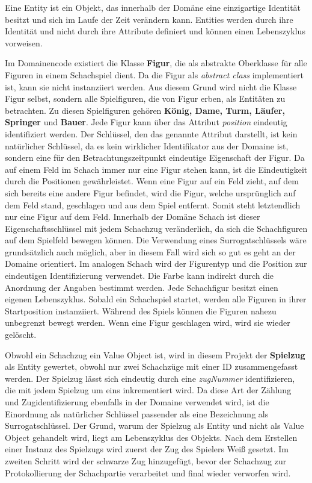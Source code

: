 Eine Entity ist ein Objekt, das innerhalb der Domäne eine einzigartige Identität besitzt und sich im Laufe der Zeit verändern kann. 
Entities werden durch ihre Identität und nicht durch ihre Attribute definiert und können einen Lebenszyklus vorweisen. 

Im Domainencode existiert die Klasse \textbf{Figur}, die als abstrakte Oberklasse für alle Figuren in einem Schachspiel dient. 
Da die Figur als \textit{abstract class} implementiert ist, kann sie nicht instanziiert werden. 
Aus diesem Grund wird nicht die Klasse Figur selbst, sondern alle Spielfiguren, die von Figur erben, als Entitäten zu betrachten. 
Zu diesen Spielfiguren gehören \textbf{König, Dame, Turm, Läufer, Springer} und \textbf{Bauer}.
Jede Figur kann über das Attribut \textit{position} eindeutig identifiziert werden.
Der Schlüssel, den das genannte Attribut darstellt, ist kein natürlicher Schlüssel, da es kein wirklicher Identifikator aus der Domaine ist, sondern eine für den Betrachtungszeitpunkt eindeutige Eigenschaft der Figur. 
Da auf einem Feld im Schach immer nur eine Figur stehen kann, ist die Eindeutigkeit durch die Positionen gewährleistet. 
Wenn eine Figur auf ein Feld zieht, auf dem sich bereits eine andere Figur befindet, wird die Figur, welche ursprünglich auf dem Feld stand, geschlagen und aus dem Spiel entfernt. 
Somit steht letztendlich nur eine Figur auf dem Feld. 
Innerhalb der Domäne \glqq Schach\grqq{} ist dieser Eigenschaftsschlüssel mit jedem Schachzug veränderlich, da sich die Schachfiguren auf dem Spielfeld bewegen können. 
Die Verwendung eines Surrogatschlüssels wäre grundsätzlich auch möglich, aber in diesem Fall wird sich so gut es geht an der Domaine orientiert. 
Im analogen Schach wird der Figurentyp und die Position zur eindeutigen Identifizierung verwendet. 
Die Farbe kann indirekt durch die Anordnung der Angaben bestimmt werden.
Jede Schachfigur besitzt einen eigenen Lebenszyklus.
Sobald ein Schachspiel startet, werden alle Figuren in ihrer Startposition instanziiert.
Während des Spiels können die Figuren nahezu unbegrenzt bewegt werden. 
Wenn eine Figur geschlagen wird, wird sie wieder gelöscht. 

Obwohl ein Schachzug ein Value Object ist, wird in diesem Projekt der \textbf{Spielzug} als Entity gewertet, obwohl nur zwei Schachzüge mit einer ID zusammengefasst werden. 
Der Spielzug lässt sich eindeutig durch eine \textit{zugNummer} identifizieren, die mit jedem Spielzug um eins inkrementiert wird.
Da diese Art der Zählung und Zugidentifizierung ebenfalls in der Domaine verwendet wird, ist die Einordnung als natürlicher Schlüssel passender als eine Bezeichnung als Surrogatschlüssel.
Der Grund, warum der Spielzug als Entity und nicht als Value Object gehandelt wird, liegt am Lebenszyklus des Objekts. 
Nach dem Erstellen einer Instanz des Spielzugs wird zuerst der Zug des Spielers \glqq Weiß\grqq{} gesetzt.
Im zweiten Schritt wird der schwarze Zug hinzugefügt, bevor der Schachzug zur Protokollierung der Schachpartie verarbeitet und final wieder verworfen wird.  

